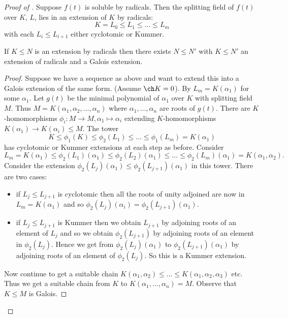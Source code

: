 \documentclass[a4paper]{article}
\begin{document}
\begin{proof}[Proof of ]
  Suppose \(f(t)\) is soluble by radicals. Then the splitting field of \(f(t)\) over \(K\), \(L\), lies in an extension of \(K\) by radicals:
  \[
    K = L_0 \leq L_1 \leq \dots \leq L_m
  \]
  with each \(L_i \leq L_{i + 1}\) either cyclotomic or Kummer.

  \begin{lemma}
    If \(K \leq N\) is an extension by radicals then there exists \(N \leq N'\) with \(K \leq N'\) an extension of radicals and a Galois extension.
  \end{lemma}

  \begin{proof}
    Suppose we have a sequence as above and want to extend this into a Galois extension of the same form. (Assume \(\ch K = 0\)). By  \(L_m = K(\alpha_1)\) for some \(\alpha_1\). Let \(g(t)\) be the minimal polynomial of \(\alpha_1\) over \(K\) with splitting field \(M\). Thus \(M = K(\alpha_1, \alpha_2, \dots, \alpha_n)\) where \(\alpha_1, \dots, \alpha_n\) are roots of \(g(t)\). There are \(K\)-homomorphisms \(\phi_i: M \to M, \alpha_1 \mapsto \alpha_i\) extending \(K\)-homomorphisms \(K(\alpha_1) \to K(\alpha_i) \leq M\). The tower
    \[
      K \leq \phi_1(K) \leq \phi_2(L_1) \leq \dots \leq \phi_1(L_m) = K(\alpha_1)
    \]
    has cyclotomic or Kummer extensions at each step as before. Consider
    \[
      L_m = K(\alpha_1) \leq \phi_2(L_1)(\alpha_1) \leq \phi_2(L_2)(\alpha_1) \leq \dots \leq \phi_2(L_m)(\alpha_1) = K(\alpha_1, \alpha_2).
    \]
    Consider the extension \(\phi_2(L_j)(\alpha_1) \leq \phi_2(L_{j + 1})(\alpha_1)\) in this tower. There are two cases:
    \begin{itemize}
    \item if \(L_j \leq L_{j + 1}\) is cyclotomic then all the roots of unity adjoined are now in \(L_m = K(\alpha_1)\) and so \(\phi_2(L_j)(\alpha_i) = \phi_2(L_{j + 1})(\alpha_1)\).
    \item if \(L_j \leq L_{j + 1}\) is Kummer then we obtain \(L_{j + 1}\) by adjoining roots of an element of \(L_j\) and so we obtain \(\phi_2(L_{j + 1})\) by adjoining roots of an element in \(\phi_2(L_j)\). Hence we get from \(\phi_2(L_j)(\alpha_1)\) to \(\phi_2(L_{j + 1})(\alpha_1)\) by adjoining roots of an element of \(\phi_2(L_j)\). So this is a Kummer extension.\
    \end{itemize}

    Now continue to get a suitable chain \(K(\alpha_1,\alpha_2) \leq \dots \leq K(\alpha_1, \alpha_2, \alpha_3)\) etc. Thus we get a suitable chain from \(K\) to \(K(\alpha_1, \dots, \alpha_n) = M\). Observe that \(K \leq M\) is Galois.
  \end{proof}


\end{proof}
\end{document}
